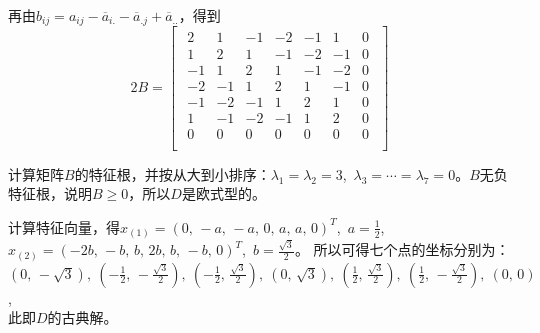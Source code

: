 \documentclass[UTF8, compress]{ctexbeamer}
\begin{document}
	\begin{frame}
		再由$b_{ij}=a_{ij}-\overline{a}_{i.}-\overline{a}_{.j}+\overline{a}_{..}$，得到
		\pause
		\begin{equation}
		2B=
		\begin{bmatrix}
		\begin{smallmatrix}
		2 & 1 & -1 & -2 & -1 & 1 & 0 \\[3pt]
		1 & 2 & 1 & -1 & -2 & -1 & 0 \\[3pt]
	   -1 & 1 & 2 & 1 & -1 & -2 & 0 \\[3pt]
	   -2 & -1 & 1 & 2 & 1 & -1 & 0 \\[3pt]
	   -1 & -2 & -1 & 1 & 2 & 1 & 0 \\[3pt]
		1 & -1 & -2 & -1 & 1 & 2 & 0 \\[3pt]
		0 & 0 & 0 & 0 & 0 & 0 & 0 \\
		\end{smallmatrix}
		\end{bmatrix}
		\end{equation}
		\pause
		
		计算矩阵$B$的特征根，并按从大到小排序：$\lambda_1=\lambda_2=3$,\ $\lambda_3=\cdots=\lambda_7=0$。$B$无负特征根，说明$B\geqslant0$，所以$D$是欧式型的。
		
		\pause
		
		计算特征向量，得$x_{(1)}=(0,\,-a,\,-a,\,0,\,a,\,a,\,0)^T$,\ $a=\frac{1}2$, \ $x_{(2)}=(-2b,\,-b,\,b,\,2b,\,b,\,-b,\,0)^T$,\ $b=\frac{\sqrt3}2$。
		\pause
		所以可得七个点的坐标分别为：$(0,\,-\sqrt3),\ (-\frac12,\,-\frac{\sqrt3}2),\ (-\frac12,\,\frac{\sqrt3}2),\ (0,\,\sqrt3),\ (\frac12,\,\frac{\sqrt3}2),\ (\frac12,\,-\frac{\sqrt3}2),\ (0,\,0)$, \\
		\vspace{.2cm}
		此即$D$的古典解。
		
	\end{frame}
	
\end{document}
